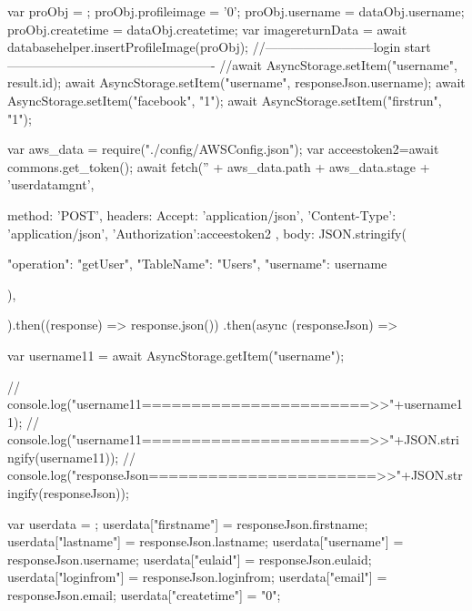 {{{{{{{{{{{{{                          var proObj = {};
                          proObj.profileimage = '0';
                          proObj.username = dataObj.username;
                          proObj.createtime = dataObj.createtime;
                          var imagereturnData = await databasehelper.insertProfileImage(proObj);
                        //--------------------------login start-------------------------------------------------
                        //await AsyncStorage.setItem("username", result.id);
                        await AsyncStorage.setItem("username", responseJson.username);
                        await AsyncStorage.setItem("facebook", "1");
                        await AsyncStorage.setItem("firstrun", "1");


                        var aws_data = require("./config/AWSConfig.json");
                        var acceestoken2=await commons.get_token();
                        await fetch('' + aws_data.path + aws_data.stage + 'userdatamgnt', {
                          method: 'POST',
                          headers: {
                            Accept: 'application/json',
                            'Content-Type': 'application/json',
                            'Authorization':acceestoken2
                          },
                          body: JSON.stringify({

                            "operation": "getUser",
                            "TableName": "Users",
                            "username": username

                          }),
                        }).then((response) => response.json())
                          .then(async (responseJson) => {

                            var username11 = await AsyncStorage.getItem("username");

                            // console.log("username11=======================>>"+username11);
                            // console.log("username11=======================>>"+JSON.stringify(username11));                 
                            // console.log("responseJson=======================>>"+JSON.stringify(responseJson));

                            var userdata = {};
                            userdata["firstname"] = responseJson.firstname;
                            userdata["lastname"] = responseJson.lastname;
                            userdata["username"] = responseJson.username;
                            userdata["eulaid"] = responseJson.eulaid;
                            userdata["loginfrom"] = responseJson.loginfrom;
                            userdata["email"] = responseJson.email;
                            userdata["createtime"] = "0";


}}}}}}}}}}}}}}
